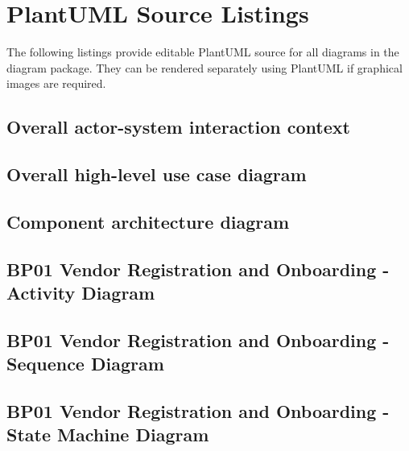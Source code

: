 \documentclass[conference]{IEEEtran}
\begin{document}
\clearpage
\appendices
\section{PlantUML Source Listings}
The following listings provide editable PlantUML source for all diagrams in the diagram package. They can be rendered separately using PlantUML if graphical images are required.


\subsection*{Overall actor-system interaction context}



\subsection*{Overall high-level use case diagram}



\subsection*{Component architecture diagram}



\subsection*{BP01 Vendor Registration and Onboarding - Activity Diagram}



\subsection*{BP01 Vendor Registration and Onboarding - Sequence Diagram}



\subsection*{BP01 Vendor Registration and Onboarding - State Machine Diagram}

\end{document}
